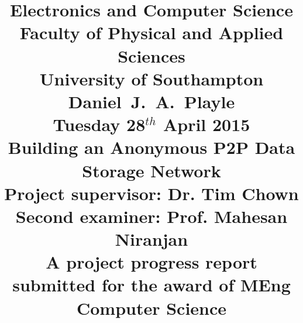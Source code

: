 \title{ \vspace{-1.0cm}
	Electronics and Computer Science\\
	Faculty of Physical and Applied Sciences\\
	University of Southampton\\
	\vspace{2.5cm}
	Daniel~J.~A.~Playle\\
	\vspace{1.0cm}
	Tuesday 28$^{th}$ April 2015\\
	\vspace{1.5cm}
	\textbf{Building an Anonymous P2P Data Storage Network}\\
	\vspace{2.5cm}
	Project supervisor: Dr. Tim Chown\\
	Second examiner: Prof. Mahesan Niranjan\\
	\vspace{1.5cm}
	A project progress report submitted for the award of MEng Computer Science\vspace{-3.0cm}}
\author{}
\date{}
\maketitle